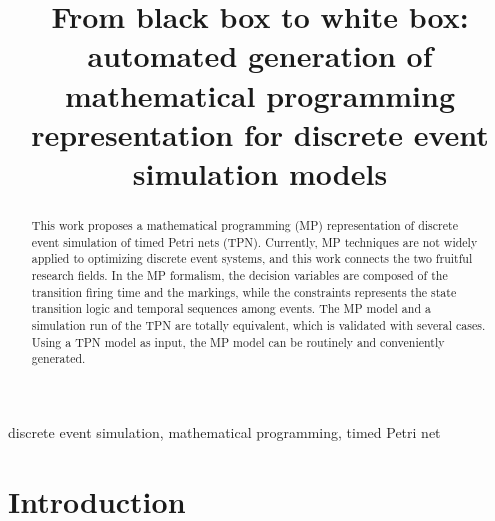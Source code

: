\documentclass[suppldata]{interact}
\theoremstyle{plain}
\theoremstyle{definition}
\theoremstyle{remark}
\begin{document}
\author{
\medskip
{}
}


\title{\Large From black box to white box: automated generation of mathematical programming representation for discrete event simulation models}

\maketitle

\bigskip
\begin{abstract}
This work proposes a mathematical programming (MP) representation of discrete event simulation of timed Petri nets (TPN). Currently, MP techniques are not widely applied to optimizing discrete event systems, and this work connects the two fruitful research fields. In the MP formalism, the decision variables are composed of the transition firing time and the markings, while the constraints represents the state transition logic and temporal sequences among events. The MP model and a simulation run of the TPN are totally equivalent, which is validated with several cases. Using a TPN model as input, the MP model can be routinely and conveniently generated.


\end{abstract}

\begin{keywords}
discrete event simulation, mathematical programming, timed Petri net
\end{keywords}


\section{Introduction}
\end{document}
